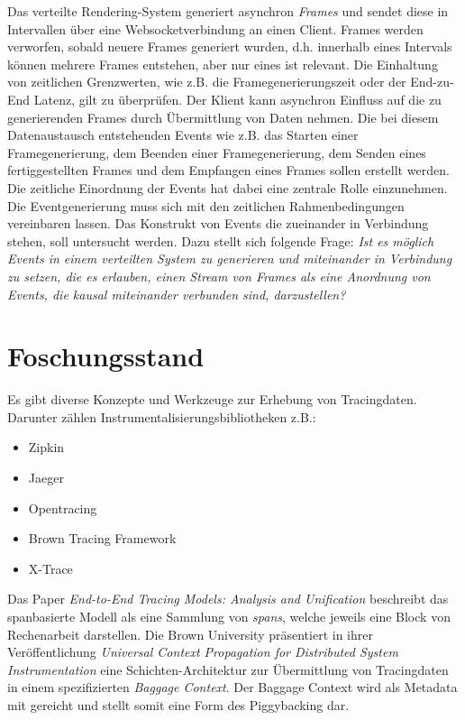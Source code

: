	Das verteilte Rendering-System generiert asynchron \emph{Frames} und sendet diese in Intervallen über eine Websocketverbindung an einen Client. Frames werden verworfen, sobald neuere Frames generiert wurden, d.h. innerhalb eines Intervals können mehrere Frames entstehen, aber nur eines ist relevant. Die Einhaltung von zeitlichen Grenzwerten, wie z.B. die Framegenerierungszeit oder der End-zu-End Latenz, gilt zu überprüfen. Der Klient kann asynchron Einfluss auf die zu generierenden Frames durch Übermittlung von Daten nehmen. Die bei diesem Datenaustausch entstehenden Events wie z.B. das Starten einer Framegenerierung, dem Beenden einer Framegenerierung, dem Senden eines fertiggestellten Frames und dem Empfangen eines Frames sollen erstellt werden. Die zeitliche Einordnung der Events hat dabei eine zentrale Rolle einzunehmen. Die Eventgenerierung muss sich mit den zeitlichen Rahmenbedingungen vereinbaren lassen. Das Konstrukt von Events die zueinander in Verbindung stehen, soll untersucht werden. Dazu stellt sich folgende Frage: \emph{Ist es möglich Events in einem verteilten System zu generieren und miteinander in Verbindung zu setzen, die es erlauben, einen Stream von Frames als eine Anordnung von Events, die kausal miteinander verbunden sind, darzustellen?}
	
\section{Foschungsstand}
\label{section:Forschungsstand}

Es gibt diverse Konzepte und Werkzeuge zur Erhebung von Tracingdaten. Darunter zählen Instrumentalisierungsbibliotheken z.B.:
\begin{itemize}
	\item Zipkin
	\item Jaeger
	\item Opentracing
	\item Brown Tracing Framework
	\item X-Trace
\end{itemize}
Das Paper \emph{End-to-End Tracing Models: Analysis and Unification} beschreibt das spanbasierte Modell als eine Sammlung von \emph{spans}, welche jeweils eine Block von Rechenarbeit darstellen. Die Brown University präsentiert in ihrer Veröffentlichung \emph{Universal Context Propagation for Distributed System Instrumentation} eine Schichten-Architektur zur Übermittlung von Tracingdaten in einem spezifizierten \emph{Baggage Context}. Der Baggage Context wird als Metadata mit gereicht und stellt somit eine Form des Piggybacking dar. 

